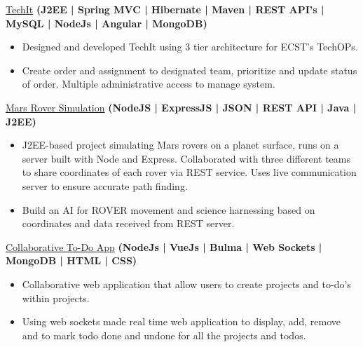 \documentclass[10pt,a4paper]{article}
\begin{document}
{{{{{\begin{tabular}{ll}
  \end{tabular}
}}

\spacedhrule{0.0em}{-0.4em}


\headedsection  %
  {\href{https://github.com/parthp2/techit-server-java}{TechIt}
  \textbf{
  \small{(J2EE | Spring MVC | Hibernate | Maven | REST API's | MySQL | NodeJs | Angular | MongoDB)}}}
  {} {%
  
    {\bodytext
    {
    \begin{itemize}
        \item Designed and developed TechIt using 3 tier architecture for ECST's TechOPs.
        \item Create order and assignment to designated team, prioritize and update status of order. Multiple administrative access to manage system.
    \end{itemize}}}
}

\headedsection  %
  {\href{https://github.com/parthp2/Mars-Rover-Simulation}{Mars Rover Simulation}
  \textbf{
  \small{(NodeJS | ExpressJS | JSON | REST API | Java | J2EE)}}}
  {} {%
  
    {\bodytext
    {
    \begin{itemize}
        \item J2EE-based project simulating Mars rovers on a planet surface, runs on a server built with Node and Express. Collaborated with three different teams to share coordinates of each rover via REST service. Uses live communication server to ensure accurate path finding.
        \item Build an AI for ROVER movement and science harnessing based on coordinates and data received from REST server.
    \end{itemize}}}
}

\headedsection  %
  {\href{https://github.com/parthp2/TodoApp}{Collaborative To-Do App}
  \textbf{
  \small{(NodeJs | VueJs | Bulma | Web Sockets | MongoDB | HTML | CSS)}}}
  {} {%
  
    {\bodytext
    {
    \begin{itemize}
        \item Collaborative web application that allow users to create projects and to-do's within projects.
        \item Using web sockets made real time web application to display, add, remove and to mark todo done and undone for all the projects and todos.
    \end{itemize}}}
}

}}}
\end{document}
